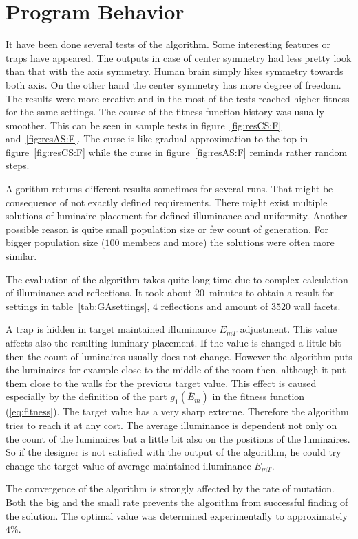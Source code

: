 \section{Program Behavior}
It have been done several tests of the algorithm. Some interesting features or traps have appeared. The outputs in case of center symmetry had less pretty look than that with the axis symmetry. Human brain simply likes symmetry towards both axis. On the other hand the center symmetry has more degree of freedom. The results were more creative and in the most of the tests reached higher fitness for the same settings. The course of the fitness function history was usually smoother. This can be seen in sample tests in figure~\ref{fig:resCS:F} and~\ref{fig:resAS:F}. The curse is like gradual approximation to the top in figure~\ref{fig:resCS:F} while the curse in figure~\ref{fig:resAS:F} reminds rather random steps.

Algorithm returns different results sometimes for several runs. That might be consequence of not exactly defined requirements. There might exist multiple solutions of luminaire placement for defined illuminance and uniformity. Another possible reason is quite small population size or few count of generation. For bigger population size ($100$ members and more) the solutions were often more similar.

The evaluation of the algorithm takes quite long time due to complex calculation of illuminance and reflections. It took about 20~minutes to obtain a result for settings in table~\ref{tab:GAsettings}, $4$ reflections and amount of $3520$ wall facets.

A trap is hidden in target maintained illuminance $\overline{E}_{mT}$ adjustment. This value affects also the resulting luminary placement. If the value is changed a little bit then the count of luminaires usually does not change. However the algorithm puts the luminaires for example close to the middle of the room then, although it put them close to the walls for the previous target value. This effect is caused especially by the definition of the part $g_1\left(\overline{E}_{m}\right)$ in the fitness function (\ref{eq:fitness}). The target value has a very sharp extreme. Therefore the algorithm tries to reach it at any cost. The average illuminance is dependent not only on the count of the luminaires but a little bit also on the positions of the luminaires. So if the designer is not satisfied with the output of the algorithm, he could try change the target value of average maintained illuminance $\overline{E}_{mT}$.

The convergence of the algorithm is strongly affected by the rate of mutation. Both the big and the small rate prevents the algorithm from successful finding of the solution. The optimal value was determined experimentally to approximately $4 \%$.